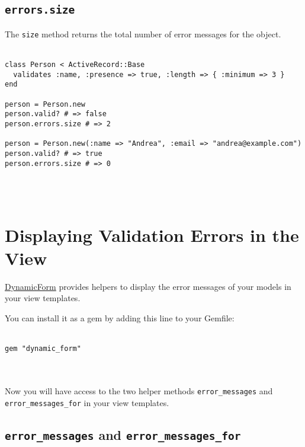 \documentclass[10pt]{book}
\begin{document}
\subsection{ \texttt{errors.size}}

The \texttt{size} method returns the total number of error messages for the object.
\\ \\
\begin{minipage}{\textwidth}{\scriptsize
\begin{verbatim}
class Person < ActiveRecord::Base
  validates :name, :presence => true, :length => { :minimum => 3 }
end
 
person = Person.new
person.valid? # => false
person.errors.size # => 2
 
person = Person.new(:name => "Andrea", :email => "andrea@example.com")
person.valid? # => true
person.errors.size # => 0
\end{verbatim}}
\end{minipage}
\\ \\

\section{ Displaying Validation Errors in the View}

\href{https://github.com/joelmoss/dynamic_form}{DynamicForm} provides helpers to display the error messages of your models in your view templates.

You can install it as a gem by adding this line to your Gemfile:
\\ \\
\begin{minipage}{\textwidth}{\scriptsize
\begin{verbatim}
gem "dynamic_form"
\end{verbatim}}
\end{minipage}
\\ \\

Now you will have access to the two helper methods \texttt{error\_messages} and \texttt{error\_messages\_for} in your view templates.

\subsection{ \texttt{error\_messages} and \texttt{error\_messages\_for}}
\end{document}
